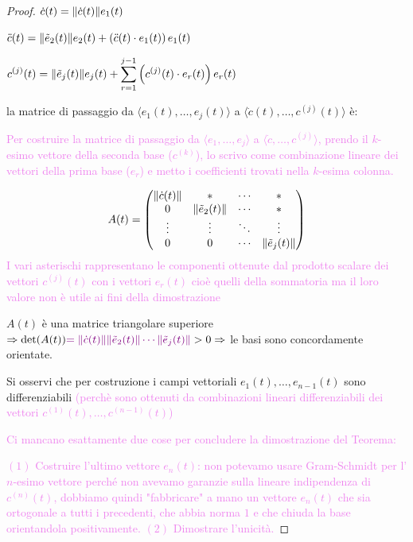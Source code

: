 \begin{proof}
        $\displaystyle \dot{c}(t) = \lVert\dot{c}(t)\rVert e_1(t)$

        \textcolor{violet}{$\displaystyle \ddot{c}(t) = \lVert\tilde{e}_2(t)\rVert e_2(t) + \left( \ddot{c}(t) \cdot e_1(t) \right) e_1(t)$}

        $\displaystyle c^{(j)}(t)=\lVert\tilde{e}_j(t)\rVert e_j(t) + \sum_{r=1}^{j-1} \left( c^{(j)}(t) \cdot e_r(t) \right) e_r(t)$ 
        
        la matrice di passaggio da $\langle e_1(t), \dots, e_j(t) \rangle$ a $\langle \dot{c}(t), \dots, c^{(j)}(t) \rangle$ è:

        \textcolor{violet}{Per costruire la matrice di passaggio da $\langle e_1, \dots, e_j \rangle$ a $\langle \dot{c}, \dots, c^{(j)} \rangle$, prendo il
        $k$-esimo vettore della seconda base ($c^{(k)}$), lo scrivo come combinazione lineare dei vettori della prima base
        ($e_r$) e metto i coefficienti trovati nella $k$-esima colonna.}

        \[ A(t) =
        \begin{pmatrix}
        \lVert\dot{c}(t)\rVert & * & \cdots & * \\
        0 & \lVert\tilde{e}_2(t)\rVert & \cdots & * \\
        \vdots & \vdots & \ddots & \vdots \\
        0 & 0 & \cdots & \lVert\tilde{e}_j(t)\rVert
        \end{pmatrix}
        \]
        \textcolor{violet}{I vari asterischi rappresentano le componenti ottenute dal prodotto scalare dei vettori $c^{(j)}(t)$ con i vettori $e_r(t)$ cioè quelli della sommatoria 
        ma il loro valore non è utile ai fini della dimostrazione }

        $A(t)$ è una matrice triangolare superiore $\Rightarrow \det(A(t)) \textcolor{violet}{= \lVert\dot{c}(t)\rVert \lVert\tilde{e}_2(t)\rVert \cdots \lVert\tilde{e}_j(t)\rVert} > 0 \Rightarrow$ 
        le basi sono concordamente orientate.

        Si osservi che per costruzione i campi vettoriali $e_1(t), \dots, e_{n-1}(t)$ sono differenziabili \textcolor{violet}{(perchè sono ottenuti da combinazioni lineari differenziabili dei vettori $c^{(1)}(t), \dots, c^{(n-1)}(t)$)}

        \textcolor{violet}{Ci mancano esattamente due cose per concludere la dimostrazione del Teorema:} 
        
        \textcolor{violet}{$(1)$ Costruire l'ultimo vettore $e_n(t)$: non potevamo usare Gram-Schmidt per l'$n$-esimo vettore
        perché non avevamo garanzie sulla lineare indipendenza di $c^{(n)}(t)$, dobbiamo quindi "fabbricare" a mano un vettore $e_n(t)$ che sia ortogonale a tutti i precedenti, che abbia norma $1$
        e che chiuda la base orientandola positivamente. $(2)$ Dimostrare l'unicità.}


\end{proof}
